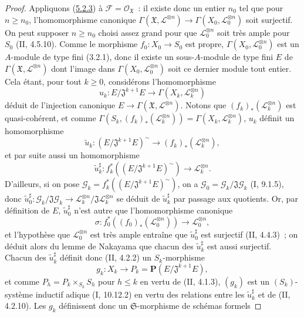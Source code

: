 \begin{proof}
Appliquons (\hyperref[III.5.2.3-fr]{5.2.3}) à
$\mathcal F=\mathcal O_{\mathfrak X}$~: il existe donc un entier $n_0$ tel que
pour $n\geq n_0$, l'homomorphisme canonique
$\Gamma(\mathfrak X,\mathcal L^{\otimes n})\to
\Gamma(X_0,\mathcal L_0^{\otimes n})$ soit surjectif. On peut supposer
$n\geq n_0$ choisi assez grand pour que $\mathcal L_0^{\otimes n}$ soit très
ample pour $S_0$ (II, 4.5.10). Comme le morphisme $f_0:X_0\to S_0$ est propre,
$\Gamma(X_0,\mathcal L_0^{\otimes n})$ est un $A$-module de type fini (3.2.1),
donc il existe un sous-$A$-module de type fini $E$ de
$\Gamma(\mathfrak X,\mathcal L^{\otimes n})$ dont l'image dans
$\Gamma(X_0,\mathcal L_0^{\otimes n})$ soit ce dernier module tout entier.
Cela étant, pour tout $k\geq0$, considérons l'homomorphisme
\[
u_k:E/\mathfrak J^{k+1}E\longrightarrow
\Gamma(X_k,\mathcal L_k^{\otimes n})
\]
déduit de l'injection canonique
$E\to\Gamma(\mathfrak X,\mathcal L^{\otimes n})$. Notons que
$(f_k)_*(\mathcal L_k^{\otimes n})$ est quasi-cohérent, et comme
$\Gamma(S_k,(f_k)_*(\mathcal L_k^{\otimes n}))
=\Gamma(X_k,\mathcal L_k^{\otimes n})$, $u_k$ définit un homomorphisme
\[
\widetilde u_k:(E/\mathfrak J^{k+1}E)^\sim
\longrightarrow(f_k)_*(\mathcal L_k^{\otimes n}),
\]
et par suite aussi un homomorphisme
\[
\widetilde u_k^\sharp:
f_k^*((E/\mathfrak J^{k+1}E)^\sim)\longrightarrow
\mathcal L_k^{\otimes n}.
\]
D'ailleurs, si on pose
$\mathcal G_k=f_k^*((E/\mathfrak J^{k+1}E)^\sim)$, on a
$\mathcal G_0=\mathcal G_k/\mathfrak J\mathcal G_k$ (I, 9.1.5), donc
$\widetilde u_0^\sharp:\mathcal G_k/\mathfrak J\mathcal G_k
\to\mathcal L_k^{\otimes n}/\mathfrak J\mathcal L_k^{\otimes n}$ se déduit
de $\widetilde u_k^\sharp$ par passage aux quotients. Or, par définition de
$E$, $\widetilde u_0^\sharp$ n'est autre que l'homomorphisme canonique
\[
\sigma:f_0^*((f_0)_*(\mathcal L_0^{\otimes n}))\longrightarrow
\mathcal L_0^{\otimes n},
\]
et l'hypothèse que $\mathcal L_0^{\otimes n}$ est très ample entraîne que
$\widetilde u_0^\sharp$ est surjectif (II, 4.4.3)~; on déduit alors du lemme
de Nakayama que chacun des $\widetilde u_k^\sharp$ est aussi surjectif.
Chacun des $\widetilde u_k^\sharp$ définit donc (II, 4.2.2) un
$S_k$-morphisme
\[
g_k:X_k\longrightarrow P_k=\mathbf P(E/\mathfrak J^{k+1}E),
\]
et comme $P_h=P_k\times_{S_k}S_h$ pour $h\leq k$ en vertu de (II, 4.1.3),
$(g_k)$ est un $(S_k)$-système inductif adique (I, 10.12.2) en vertu des
relations entre les $\widetilde u_k^\sharp$ et de (II, 4.2.10). Les $g_k$
définissent donc un $\mathfrak S$-morphisme de schémas formels

\end{proof}
